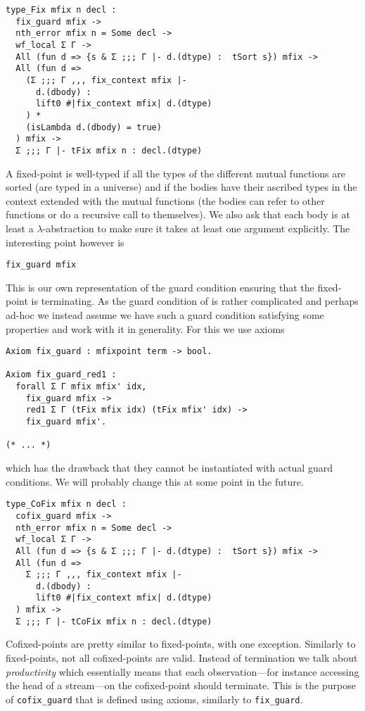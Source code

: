 \begin{verbatim}
type_Fix mfix n decl :
  fix_guard mfix ->
  nth_error mfix n = Some decl ->
  wf_local Σ Γ ->
  All (fun d => {s & Σ ;;; Γ |- d.(dtype) :  tSort s}) mfix ->
  All (fun d =>
    (Σ ;;; Γ ,,, fix_context mfix |-
      d.(dbody) :
      lift0 #|fix_context mfix| d.(dtype)
    ) *
    (isLambda d.(dbody) = true)
  ) mfix ->
  Σ ;;; Γ |- tFix mfix n : decl.(dtype)
\end{verbatim}
A fixed-point is well-typed if all the types of the different mutual functions
are sorted (\ie are typed in a universe) and if the bodies have their ascribed
types in the context extended with the mutual functions (the bodies can refer
to other functions or do a recursive call to themselves).
We also ask that each body is at least a \(\lambda\)-abstraction to make sure it
takes at least one argument explicitly.
The interesting point however is
\begin{verbatim}
fix_guard mfix
\end{verbatim}
This is our own representation of the guard condition ensuring that the
fixed-point is terminating. As the guard condition of \Coq is rather complicated
and perhaps ad-hoc we instead assume we have such a guard condition satisfying
some properties and work with it in generality.
For this we use axioms
\begin{verbatim}
Axiom fix_guard : mfixpoint term -> bool.

Axiom fix_guard_red1 :
  forall Σ Γ mfix mfix' idx,
    fix_guard mfix ->
    red1 Σ Γ (tFix mfix idx) (tFix mfix' idx) ->
    fix_guard mfix'.

(* ... *)
\end{verbatim}
which has the drawback that they cannot be instantiated with actual guard
conditions. We will probably change this at some point in the future.

\begin{verbatim}
type_CoFix mfix n decl :
  cofix_guard mfix ->
  nth_error mfix n = Some decl ->
  wf_local Σ Γ ->
  All (fun d => {s & Σ ;;; Γ |- d.(dtype) :  tSort s}) mfix ->
  All (fun d =>
    Σ ;;; Γ ,,, fix_context mfix |-
      d.(dbody) :
      lift0 #|fix_context mfix| d.(dtype)
  ) mfix ->
  Σ ;;; Γ |- tCoFix mfix n : decl.(dtype)
\end{verbatim}
Cofixed-points are pretty similar to fixed-points, with one exception.
Similarly to fixed-points, not all cofixed-points are valid. Instead of
termination we talk about \emph{productivity} which essentially means that each
observation---for instance accessing the head of a stream---on the cofixed-point
should terminate.
This is the purpose of \texttt{cofix_guard} that is defined using
axioms, similarly to \texttt{fix_guard}.

